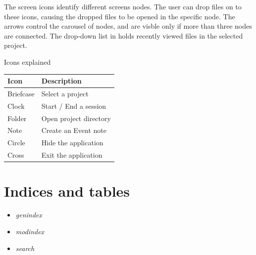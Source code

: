 \documentclass[letterpaper,10pt,english]{sphinxmanual}
\begin{document}
The screen icons identify different screens nodes. The user can drop files on to these icons, causing the dropped files to be opened in the specific node. The arrows control the carousel of nodes, and are visble only if more than three nodes are connected. The drop-down list in holds recently viewed files in the selected project.


\begin{threeparttable}
\capstart\caption{Icons explained}

\begin{tabulary}{\linewidth}{|L|L|}
\hline
\textbf{
Icon
} & \textbf{
Description
}\\\hline

Briefcase
 & 
Select a project
\\\hline

Clock
 & 
Start / End a session
\\\hline

Folder
 & 
Open project directory
\\\hline

Note
 & 
Create an Event note
\\\hline

Circle
 & 
Hide the application
\\\hline

Cross
 & 
Exit the application
\\\hline
\end{tabulary}

\end{threeparttable}



\chapter{Indices and tables}
\label{index:indices-and-tables}\begin{itemize}
\item {} 
\emph{genindex}

\item {} 
\emph{modindex}

\item {} 
\emph{search}

\end{itemize}
\end{document}
